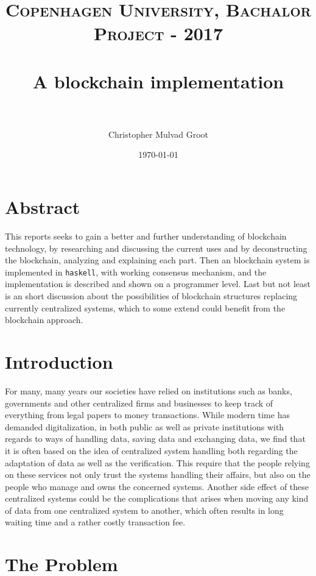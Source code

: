 \documentclass[paper=a4, fontsize=11pt]{scrartcl} %
\title{	
\normalfont \normalsize 
\textsc{Copenhagen University, Bachalor Project - 2017} \\ [25pt] %
\horrule{0.5pt} \\[0.4cm] %
\huge A blockchain implementation \\ %
\horrule{2pt} \\[0.5cm] %
}
\author{Christopher Mulvad Groot} %
\date{\normalsize\today} %
\numberwithin{equation}{section} %
\numberwithin{figure}{section} %
\numberwithin{table}{section} %
\begin{document}
\maketitle %
\thispagestyle{empty}
\newpage
\tableofcontents
\thispagestyle{empty}
\newpage

\clearpage
\setcounter{page}{1}

\section{Abstract}

This reports seeks to gain a better and further understanding of blockchain technology, by researching and discussing the current uses and by deconstructing the blockchain, analyzing and explaining each part. Then an blockchain system is implemented in \texttt{haskell}, with working consensus mechanism, and the implementation is described and shown on a programmer level. Last but not least is an short discussion about the possibilities of blockchain structures replacing currently centralized systems, which to some extend could benefit from the blockchain approach. 

\section{Introduction}

For many, many years our societies have relied on institutions such as banks, governments and other centralized firms and businesses to keep track of everything from legal papers to money transactions. While modern time has demanded digitalization, in both public as well as private institutions with regards to ways of handling data, saving data and exchanging data, we find that it is often based on the idea of centralized system handling both regarding the adaptation of data as well as the verification. This require that the people relying on these services not only trust the systems handling their affairs, but also on the people who manage and owns the concerned systems. Another side effect of these centralized systems could be the complications that arises when moving any kind of data from one centralized system to another, which often results in long waiting time and a rather costly transaction fee.

\section{The Problem}
\end{document}
